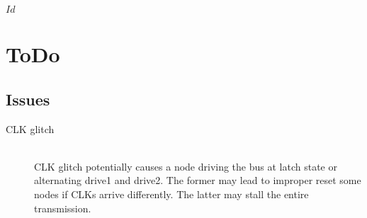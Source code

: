 \svnInfo $Id$

\section{ToDo}
\label{sec:todo}
\subsection{Issues}
\begin{description}
	\item[CLK glitch] \hfil \\
	CLK glitch potentially causes a node driving the bus at {\sc latch state} or
	alternating {\sc drive1} and {\sc drive2}. The former may lead to improper
	reset some nodes if CLKs arrive differently. The latter may stall the entire
	transmission.
\end{description}
